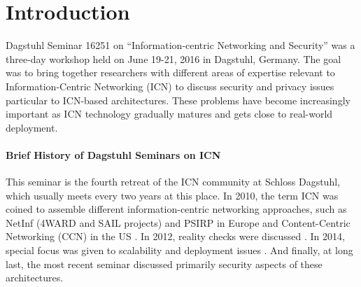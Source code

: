 \documentclass{sig-alternate-05-2015}
\begin{document}

\printccsdesc
{}


\section{Introduction}
Dagstuhl Seminar 16251 on ``Information-centric Networking and Security'' was a three-day
workshop held on June 19-21, 2016 in Dagstuhl, Germany. The goal was to bring together researchers with
different areas of expertise relevant to Information-Centric Networking (ICN) to discuss
security and privacy issues particular to ICN-based architectures. These problems have
become increasingly important as ICN technology gradually matures and gets close to real-world deployment.

\paragraph{Brief History of Dagstuhl Seminars on ICN}
This seminar is the fourth retreat of the ICN community at Schloss Dagstuhl, which
usually meets every two years at this place. In 2010, the term ICN was
coined to assemble different informa\-tion-centric networking approaches,
such as NetInf (4WARD and SAIL projects) and PSIRP in Europe and Content-Centric Networking (CCN) in the US \cite{dagstuhl2010}.
In 2012, reality checks were discussed \cite{dagstuhl2012}. In 2014, special focus was given to scalability
and deployment issues \cite{dagstuhl2014}. And finally, at long last, the most
recent seminar discussed primarily security aspects of these architectures.
\end{document}
